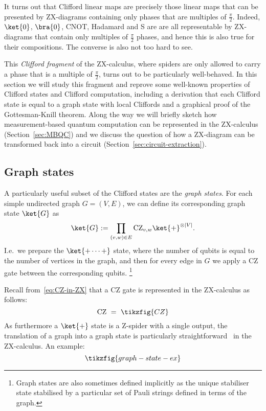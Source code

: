 \documentclass[a4paper,onecolumn,superscriptaddress,11pt,%
				unpublished,%
				allowfontchageintitle,%
				]{quantumarticle}
\begin{document}
It turns out that Clifford linear maps are precisely those linear maps that can be presented by ZX-diagrams containing only phases that are multiples of $\frac{\pi}{2}$. Indeed, $\ket{0}$, $\bra{0}$, CNOT, Hadamard and S are are all representable by ZX-diagrams that contain only multiples of $\frac{\pi}{2}$ phases, and hence this is also true for their compositions. The converse is also not too hard to see.

This \emph{Clifford fragment} of the ZX-calculus, where spiders are only allowed to carry a phase that is a multiple of $\frac\pi2$, turns out to be particularly well-behaved. In this section we will study this fragment and reprove some well-known properties of Clifford states and Clifford computation, including a derivation that each Clifford state is equal to a graph state with local Cliffords and a graphical proof of the Gottesman-Knill theorem.
Along the way we will briefly sketch how measurement-based quantum computation can be represented in the ZX-calculus (Section~\ref{sec:MBQC}) and we discuss the question of how a ZX-diagram can be transformed back into a circuit (Section~\ref{sec:circuit-extraction}).


\subsection{Graph states}\label{sec:graph-state}

A particularly useful subset of the Clifford states are the \emph{graph states}. For each simple undirected graph $G=(V,E)$, we can define its corresponding graph state $\ket{G}$ as 
$$\ket{G}:= \prod_{(v,w)\in E} \text{CZ}_{v,w} \ket{+}^{\otimes \lvert V\rvert}.$$
I.e.~we prepare the $\ket{+\cdots +}$ state, where the number of qubits is equal to the number of vertices in the graph, and then for every edge in $G$ we apply a CZ gate between the corresponding qubits.%
\footnote{Graph states are also sometimes defined implicitly as the unique stabiliser state stabilised by a particular set of Pauli strings defined in terms of the graph.}

Recall from~\eqref{eq:CZ-in-ZX} that a CZ gate is represented in the ZX-calculus as follows:
\begin{equation}\label{eq:CZ}
	\text{CZ} \ = \ \tikzfig{CZ} 
\end{equation}
As furthermore a $\ket{+}$ state is a Z-spider with a single output, the translation of a graph into a graph state is particularly straightforward~\cite{DP1} in the ZX-calculus. An example:
\begin{equation}\label{eq:graph-state-ex}
\tikzfig{graph-state-ex}
\end{equation}
\end{document}
